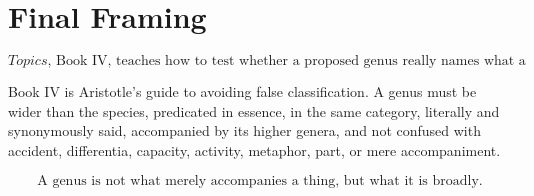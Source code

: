 \documentclass[12pt]{article}
\begin{document}
\section*{Final Framing}

\[
\boxed{
\textit{Topics}, \text{ Book IV, teaches how to test whether a proposed genus really names what a thing is broadly.}
}
\]

Book IV is Aristotle's guide to avoiding false classification. A genus must be
wider than the species, predicated in essence, in the same category, literally
and synonymously said, accompanied by its higher genera, and not confused with
accident, differentia, capacity, activity, metaphor, part, or mere accompaniment.

\[
\boxed{
\text{A genus is not what merely accompanies a thing, but what it is broadly.}
}
\]
\end{document}
